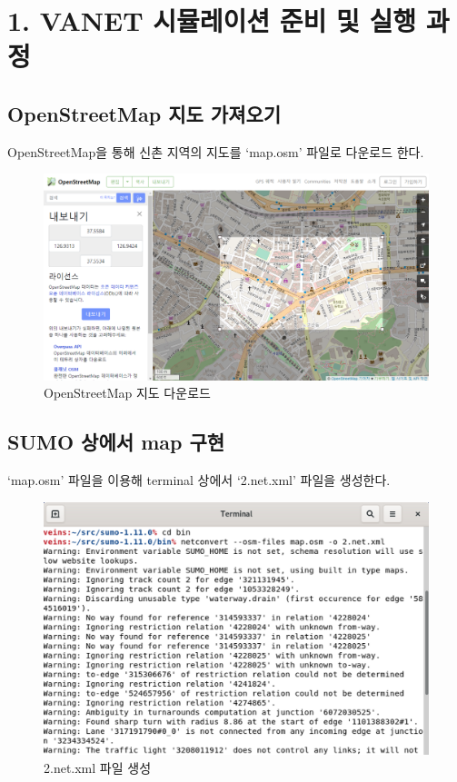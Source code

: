 \vspace{-6mm}
\section*{1. VANET 시뮬레이션 준비 및 실행 과정}

\subsection*{OpenStreetMap 지도 가져오기}
    OpenStreetMap을 통해 신촌 지역의 지도를 ‘map.osm’ 파일로 다운로드 한다.
    \vspace{-3mm}
    \begin{figure}[!h]\centering 
        \includegraphics[width=.80\textwidth]{image/week14/1-1.png}
        \caption{\footnotesize
        OpenStreetMap 지도 다운로드}
        \vspace{-10pt}
    \end{figure}
   
\subsection*{SUMO 상에서 map 구현}
    ‘map.osm’ 파일을 이용해 terminal 상에서 ‘2.net.xml’ 파일을 생성한다.
    \vspace{-3mm}
    \begin{figure}[!h]\centering 
        \includegraphics[width=.68\textwidth]{image/week14/1-2.png}
        \caption{\footnotesize
        2.net.xml 파일 생성}
        \vspace{-10pt}
    \end{figure}
\newpage
    
